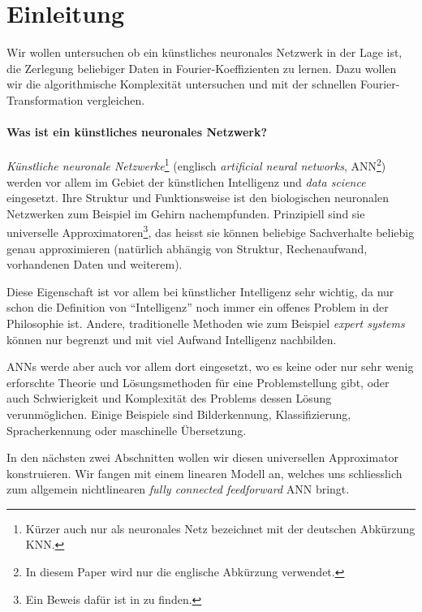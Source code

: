 %
%
%
%
\section{Einleitung\label{ml:einleitung}}

Wir wollen untersuchen ob ein künstliches neuronales Netzwerk in der Lage ist, die Zerlegung beliebiger
Daten in Fourier-Koeffizienten zu lernen. Dazu wollen wir die algorithmische
Komplexität untersuchen und mit der schnellen Fourier-Transformation vergleichen.
%

\paragraph{Was ist ein künstliches neuronales Netzwerk?}
\emph{Künstliche neuronale
Netzwerke}\footnote{Kürzer auch nur als neuronales Netz bezeichnet mit der deutschen
Abkürzung KNN.} (englisch \emph{artificial neural networks}, ANN\footnote{In diesem Paper
%
%
wird nur die englische Abkürzung verwendet.}) werden vor allem im Gebiet der künstlichen
Intelligenz und \emph{data science} eingesetzt. Ihre Struktur und Funktionsweise ist den
biologischen neuronalen Netzwerken zum Beispiel im Gehirn nachempfunden. Prinzipiell sind
sie universelle Approximatoren\footnote{Ein Beweis dafür ist in
\cite{ml:universala-approximator-theorem} zu finden.}, das heisst sie können beliebige
Sachverhalte beliebig genau approximieren (natürlich abhängig von Struktur, Rechenaufwand,
vorhandenen Daten und weiterem).

Diese Eigenschaft ist vor allem bei künstlicher Intelligenz sehr wichtig,
da nur schon die Definition von ``Intelligenz'' noch immer ein offenes Problem in der
Philosophie ist. Andere, traditionelle Methoden wie zum Beispiel \emph{expert systems} können
%
nur begrenzt und mit viel Aufwand Intelligenz nachbilden.

ANNs werde aber auch vor allem dort eingesetzt, wo es keine oder nur sehr wenig erforschte
Theorie und Lösungsmethoden für eine Problemstellung gibt, oder auch Schwierigkeit und
Komplexität des Problems dessen Lösung verunmöglichen. Einige Beispiele sind
Bilderkennung, Klassifizierung, Spracherkennung oder maschinelle Übersetzung.
%
%
%
%

\medskip
In den nächsten zwei Abschnitten wollen wir diesen universellen Approximator konstruieren.
%
%
Wir fangen mit einem linearen Modell an, welches uns schliesslich zum allgemein
nichtlinearen \emph{fully connected feedforward} ANN bringt.
